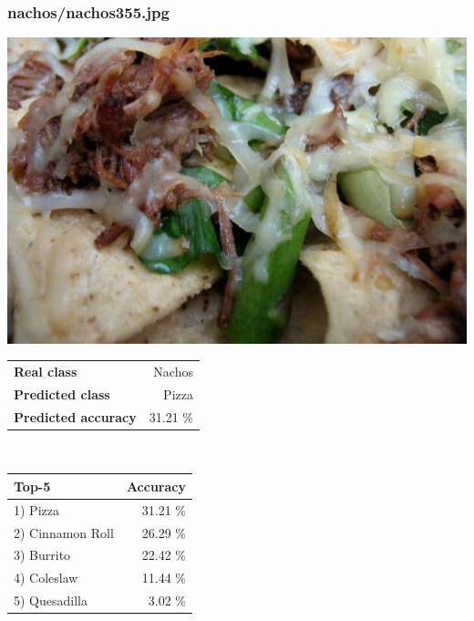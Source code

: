 \subsubsection{nachos/nachos355.jpg}

\begin{minipage}[t]{0.4\textwidth}
	\vspace{0pt}
	\includegraphics[width=\linewidth]{images/evaluation-images/nachos/nachos355.jpg}
\end{minipage}
\hfill
\begin{minipage}[t]{0.5\textwidth}
	\vspace{0pt}\raggedright
	\begin{tabularx}{\textwidth}{X r}
		\small \textbf{Real class} & \small Nachos\\
		\small \textbf{Predicted class} & \small Pizza\\
		\small \textbf{Predicted accuracy} & \small 31.21 \%
    \end{tabularx}\\
    
    \vspace{6pt}
	\begin{tabularx}{\textwidth}{X r}
        \small \textbf{Top-5} & \small \textbf{Accuracy} \\
        \hline
		\small 1) Pizza & \small 31.21 \%\\\small 2) Cinnamon Roll & \small 26.29 \%\\\small 3) Burrito & \small 22.42 \%\\\small 4) Coleslaw & \small 11.44 \%\\\small 5) Quesadilla & \small 3.02 \%
    \end{tabularx}
\end{minipage}
    
